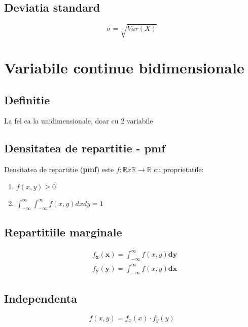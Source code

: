 \documentclass[oneside]{memoir}
\begin{document}
\subsection*{Deviatia standard}
\begin{center}
    \begin{equation*}
\sigma = \sqrt{Var(X)}
    \end{equation*}
\end{center}

\section[Variabile continue bidimensionale]{Variabile continue bidimensionale}
\subsection*{Definitie}
La fel ca la unidimensionale, doar cu 2 variabile

\subsection*{Densitatea de repartitie - pmf} Densitatea de repartitie (\textbf{pmf}) este $f:\mathbb{R}x\mathbb{R}\rightarrow \mathbb{R}$ cu proprietatile:
\begin{enumerate}
    \item $f(x,y) \geq 0$
    \item $\int_{-\infty}^{\infty}\int_{-\infty}^{\infty}f(x,y)dx dy = 1$
\end{enumerate}

\subsection*{Repartitiile marginale}
\begin{center}
    \begin{equation*}
        \begin{split}            
&f_{\mathbf{x}}(\mathbf{x}) = \int_{-\infty}^{\infty}f(x,y) \mathbf{dy}\\
&f_{\mathbf{y}}(\mathbf{y}) = \int_{-\infty}^{\infty}f(x,y) \mathbf{dx}
    \end{split}
    \end{equation*}
\end{center}

\subsection*{Independenta}
\begin{center}
    \begin{equation*}
f(x,y) = f_x(x) \cdot f_y(y)
    \end{equation*}
\end{center}
\end{document}
